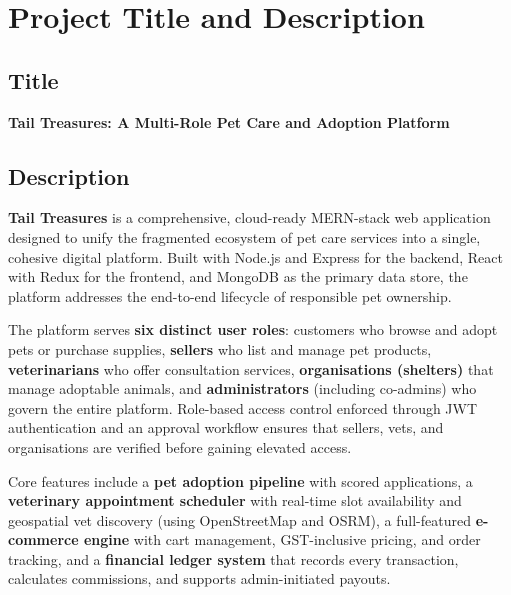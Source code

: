 \documentclass[12pt,a4paper]{article}
\begin{document}
\newpage
\tableofcontents
\newpage

\section{Project Title and Description}

\subsection*{Title}
\begin{tcolorbox}[enhanced, colback=ctxBlue!30!white, colframe=primary,
  arc=4pt, boxrule=1pt, left=10pt, right=10pt, top=8pt, bottom=8pt]
  {\large\bfseries\color{primary} Tail Treasures: A Multi-Role Pet Care and Adoption Platform}
\end{tcolorbox}

\subsection*{Description}

\textbf{Tail Treasures} is a comprehensive, cloud-ready MERN-stack web application designed to unify the fragmented ecosystem of pet care services into a single, cohesive digital platform. Built with Node.js and Express for the backend, React with Redux for the frontend, and MongoDB as the primary data store, the platform addresses the end-to-end lifecycle of responsible pet ownership.

The platform serves \textbf{six distinct user roles}: customers who browse and adopt pets or purchase supplies, \textbf{sellers} who list and manage pet products, \textbf{veterinarians} who offer consultation services, \textbf{organisations (shelters)} that manage adoptable animals, and \textbf{administrators} (including co-admins) who govern the entire platform. Role-based access control enforced through JWT authentication and an approval workflow ensures that sellers, vets, and organisations are verified before gaining elevated access.

Core features include a \textbf{pet adoption pipeline} with scored applications, a \textbf{veterinary appointment scheduler} with real-time slot availability and geospatial vet discovery (using OpenStreetMap and OSRM), a full-featured \textbf{e-commerce engine} with cart management, GST-inclusive pricing, and order tracking, and a \textbf{financial ledger system} that records every transaction, calculates commissions, and supports admin-initiated payouts.
\end{document}
